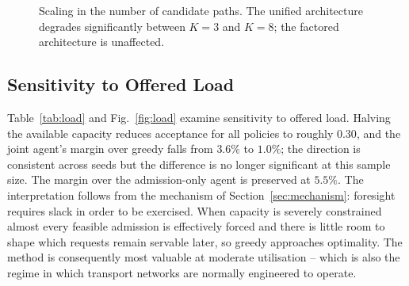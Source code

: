 \documentclass[10pt,journal,comsoc]{IEEEtran}
\begin{document}
\begin{figure}[t]
\centering
{}
\caption{Scaling in the number of candidate paths. The unified
architecture degrades significantly between $K=3$ and $K=8$; the factored
architecture is unaffected.}
\label{fig:scaling}
\end{figure}

\subsection{Sensitivity to Offered Load}
\label{sec:load}
Table~\ref{tab:load} and Fig.~\ref{fig:load} examine sensitivity to
offered load. Halving the available capacity reduces acceptance for all
policies to roughly $0.30$, and the joint agent's margin over greedy
falls from $3.6\%$ to $1.0\%$; the direction is consistent across seeds
but the difference is no longer significant at this sample size. The
margin over the admission-only agent is preserved at $5.5\%$. The
interpretation follows from the mechanism of
Section~\ref{sec:mechanism}: foresight requires slack in order to be
exercised. When capacity is severely constrained almost every feasible
admission is effectively forced and there is little room to shape which
requests remain servable later, so greedy approaches optimality. The
method is consequently most valuable at moderate utilisation -- which is
also the regime in which transport networks are normally engineered to
operate.
\end{document}
